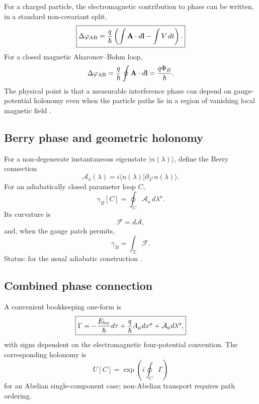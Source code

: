 For a charged particle, the electromagnetic contribution to phase can be written, in a standard non-covariant split,
\begin{equation}
\boxed{
\Delta\varphi_{\rm AB}
=\frac{q}{\hbar}
\left(
\int \mathbf A\cdot d\mathbf l
-\int V\,dt
\right).
}
\end{equation}
For a closed magnetic Aharonov--Bohm loop,
\begin{equation}
\Delta\varphi_{\rm AB}=\frac{q}{\hbar}\oint\mathbf A\cdot d\mathbf l
=\frac{q\Phi_B}{\hbar}.
\end{equation}
The physical point is that a measurable interference phase can depend on gauge-potential holonomy even when the particle paths lie in a region of vanishing local magnetic field \cite{AharonovBohm1959}.

\subsection{Berry phase and geometric holonomy}

For a non-degenerate instantaneous eigenstate \(|n(\lambda)\rangle\), define the Berry connection
\begin{equation}
\mathcal A_a(\lambda)=i\langle n(\lambda)|\partial_{\lambda^a}n(\lambda)\rangle.
\end{equation}
For an adiabatically closed parameter loop \(C\),
\begin{equation}
\boxed{\gamma_B[C]=\oint_C\mathcal A_a\,d\lambda^a.}
\end{equation}
Its curvature is
\begin{equation}
\mathcal F=d\mathcal A,
\end{equation}
and, when the gauge patch permits,
\begin{equation}
\gamma_B=\int_\Sigma\mathcal F.
\end{equation}
Status:  for the usual adiabatic construction \cite{Berry1984}.

\subsection{Combined phase connection}

A convenient bookkeeping one-form is
\begin{equation}
\boxed{
\Gamma
= -\frac{E_{\rm loc}}{\hbar}d\tau
+\frac{q}{\hbar}A_\mu dx^\mu
+\mathcal A_a d\lambda^a,
}
\label{eq:combined-connection}
\end{equation}
with signs dependent on the electromagnetic four-potential convention. The corresponding holonomy is
\begin{equation}
\boxed{U[C]=\exp\left(i\oint_C\Gamma\right)}
\end{equation}
for an Abelian single-component case; non-Abelian transport requires path ordering.

